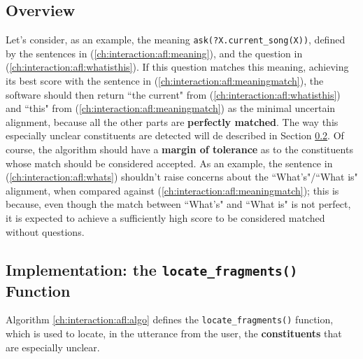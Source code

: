 \subsection{Overview}
Let's consider, as an example, the meaning \texttt{ask(?X.current\_song(X))}, defined by the sentences in (\ref{ch:interaction:afl:meaning}), and the question in (\ref{ch:interaction:afl:whatisthis}). If this question matches this meaning, achieving its best score with the sentence in  (\ref{ch:interaction:afl:meaningmatch}), the software should then return ``the current" from (\ref{ch:interaction:afl:whatisthis}) and ``this" from (\ref{ch:interaction:afl:meaningmatch}) as the minimal uncertain alignment, because all the other parts are \textbf{perfectly matched}. The way this especially unclear constituents are detected will de described in Section \ref{ch:interaction:afl:impl}.
 \label{ch:interaction:afl:meaning}
\vspace{-0.5cm} %
Of course, the algorithm should have a \textbf{margin of tolerance} as to the constituents whose match should be considered accepted. As an example, the sentence in (\ref{ch:interaction:afl:whats}) shouldn't raise concerns about the ``What's"/``What is" alignment, when compared against (\ref{ch:interaction:afl:meaningmatch}); this is because, even though the match between ``What's" and ``What is" is not perfect, it is expected to achieve a sufficiently high score to be considered matched without questions.


\subsection{Implementation: the \texttt{locate\_fragments()} Function} \label{ch:interaction:afl:impl}
Algorithm \ref{ch:interaction:afl:algo} defines the \texttt{locate\_fragments()} function, which is used to locate, in the utterance from the user, the \textbf{constituents} that are especially unclear.

